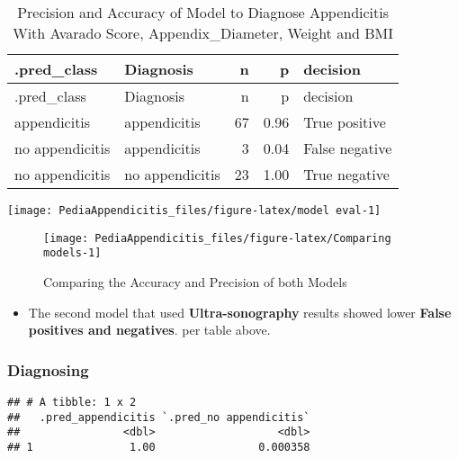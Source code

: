 \documentclass[
]{article}
\providecommand{\tightlist}{%
  \setlength{\itemsep}{0pt}\setlength{\parskip}{0pt}}
\begin{document}
\begin{longtable}[]{@{}llrrl@{}}
\caption{Precision and Accuracy of Model to Diagnose Appendicitis With
Avarado Score, Appendix\_Diameter, Weight and BMI}\tabularnewline
\toprule\noalign{}
.pred\_class & Diagnosis & n & p & decision \\
\midrule\noalign{}
\endfirsthead
\toprule\noalign{}
.pred\_class & Diagnosis & n & p & decision \\
\midrule\noalign{}
\endhead
\bottomrule\noalign{}
\endlastfoot
appendicitis & appendicitis & 67 & 0.96 & True positive \\
no appendicitis & appendicitis & 3 & 0.04 & False negative \\
no appendicitis & no appendicitis & 23 & 1.00 & True negative \\
\end{longtable}

\begin{center}\texttt{[image: PediaAppendicitis\_files/figure-latex/model eval-1]} \end{center}

\begin{figure}

{\centering \texttt{[image: PediaAppendicitis\_files/figure-latex/Comparing models-1]} 

}

\caption{Comparing the Accuracy and Precision of both Models}\label{fig:Comparing models}
\end{figure}

\begin{itemize}
\tightlist
\item
  The second model that used \textbf{Ultra-sonography} results showed
  lower \textbf{False positives and negatives}. per table above.
\end{itemize}

\subsubsection{Diagnosing}\label{diagnosing}

\begin{verbatim}
## # A tibble: 1 x 2
##   .pred_appendicitis `.pred_no appendicitis`
##                <dbl>                   <dbl>
## 1               1.00                0.000358
\end{verbatim}
\end{document}
